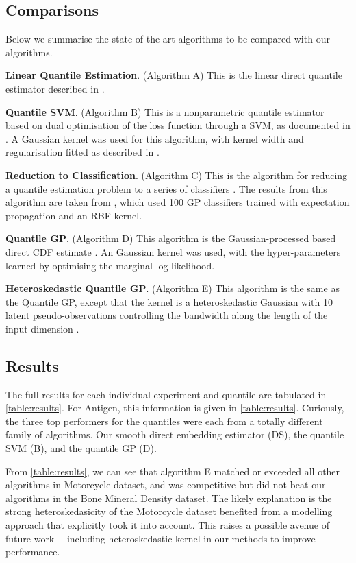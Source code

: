 \documentclass[twoside]{article} \usepackage{aistats2017}
\theoremstyle{definition}
\theoremstyle{theorem}
\begin{document}
	\subsection{Comparisons}
	\label{sec:experiments:comparison}
	
		Below we summarise the state-of-the-art algorithms to be compared with our algorithms.
		
		\textbf{Linear Quantile Estimation}. (Algorithm A) This is the linear direct quantile estimator described in \cite{koenker1978regression}.
		
		\textbf{Quantile SVM}. (Algorithm B) This is a nonparametric quantile estimator based on dual optimisation of the loss function through a SVM, as documented in \cite{takeuchi2006nonparametric}. A Gaussian kernel was used for this algorithm, with kernel width and regularisation fitted as described in \cite{quadrianto2009kernel}.
		
		\textbf{Reduction to Classification}. (Algorithm C) This is the algorithm for reducing a quantile estimation problem to a series of classifiers \citep{langford2012predicting}. The results from this algorithm are taken from \cite{quadrianto2009kernel}, which used 100 GP classifiers trained with expectation propagation and an RBF kernel.
		
		\textbf{Quantile GP}. (Algorithm D) This algorithm is the Gaussian-processed based direct CDF estimate \cite{quadrianto2009kernel}. An Gaussian kernel was used, with the hyper-parameters learned by optimising the marginal log-likelihood.
		
		\textbf{Heteroskedastic Quantile GP}. (Algorithm E) This algorithm is the same as the Quantile GP, except that the kernel is a heteroskedastic Gaussian with 10 latent pseudo-observations controlling the bandwidth along the length of the input dimension \citep{quadrianto2009kernel}. 
		
	\subsection{Results}
	\label{sec:experiments:results}
	
		The full results for each individual experiment and quantile are tabulated in \cref{table:results}. For Antigen, this information is given in \cref{table:results}. Curiously, the three top performers for the quantiles were each from a totally different family of algorithms. Our smooth direct embedding estimator (DS), the quantile SVM (B), and the quantile GP (D).
		
		From \cref{table:results}, we can see that algorithm E matched or exceeded all other algorithms in Motorcycle dataset, and was competitive but did not beat our algorithms in the Bone Mineral Density dataset. The likely explanation is the strong heteroskedasicity of the Motorcycle dataset benefited from a modelling approach that explicitly took it into account. This raises a possible avenue of future work--- including heteroskedastic kernel in our methods to improve performance.


\end{document}
